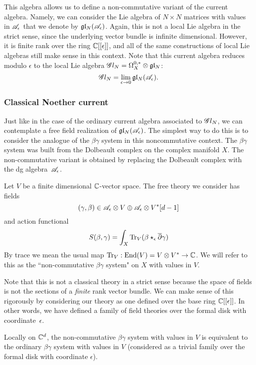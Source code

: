 This algebra allows us to define a non-commutative variant of the current algebra. 
Namely, we can consider the Lie algebra of $N \times N$ matrices with values in $\mathscr A_\epsilon$ that we denote by $\mathfrak{g} \mathfrak{l}_N(\mathscr A_{\epsilon})$. 
Again, this is not a local Lie algebra in the strict sense, since the underlying vector bundle is infinite dimensional. 
However, it is finite rank over the ring $\mathbb C[[\epsilon]]$, and all of the same constructions of local Lie algebras still make sense in this context. 
Note that this current algebra reduces modulo $\epsilon$ to the local Lie algebra $\mathscr G l_N = \Omega^{0,*}_X \otimes \mathfrak{g} \mathfrak{l}_N$:
\[
\mathscr G l_N = \lim_{\epsilon \to 0} \mathfrak{g} \mathfrak{l}_N(\mathscr A_{\epsilon})  .
\]

\subsubsection{Classical Noether current}

Just like in the case of the ordinary current algebra associated to $\mathscr G l_N$, we can contemplate a free field realization of $\mathfrak{g} \mathfrak{l}_N(\mathscr A_{\epsilon})$.
The simplest way to do this is to consider the analogue of the $\beta\gamma$ system in this noncommutative context. 
The $\beta\gamma$ system was built from the Dolbeault complex on the complex manifold $X$. 
The non-commutative variant is obtained by replacing the Dolbeault complex with the dg algebra~$\mathscr A_\epsilon$. 

Let $V$ be a finite dimensional $\mathbb C$-vector space.
The free theory we consider has fields 
\[
(\gamma, \beta) \in \mathscr A_\epsilon \otimes V \oplus \mathscr A_\epsilon \otimes V^* [d-1] 
\]
and action functional
\[
S(\beta,\gamma) = \int_X {\rm Tr}_V(\beta \star_{\epsilon} \overline{\partial} \gamma)
\]
By trace we mean the usual map ${\rm Tr}_V : {\rm End}(V) = V \otimes V^* \to \mathbb C$. 
We will refer to this as the ``non-commutative $\beta\gamma$ system" on $X$ with values in $V$.

\begin{rmk}
Note that this is not a classical theory in a strict sense because the space of fields is not the sections of a {\em finite} rank vector bundle. 
We can make sense of this rigorously by considering our theory as one defined over the base ring $\mathbb C[[\epsilon]]$. 
In other words, we have defined a family of field theories over the formal disk with coordinate~$\epsilon$. 
\end{rmk}

\begin{lem}\label{lem: nonbg}
Locally on $\mathbb C^d$, the non-commutative $\beta\gamma$ system with values in $V$ is equivalent to the ordinary $\beta\gamma$ system with values in $V$ (considered as a trivial family over the formal disk with coordinate $\epsilon$). 
\end{lem}


